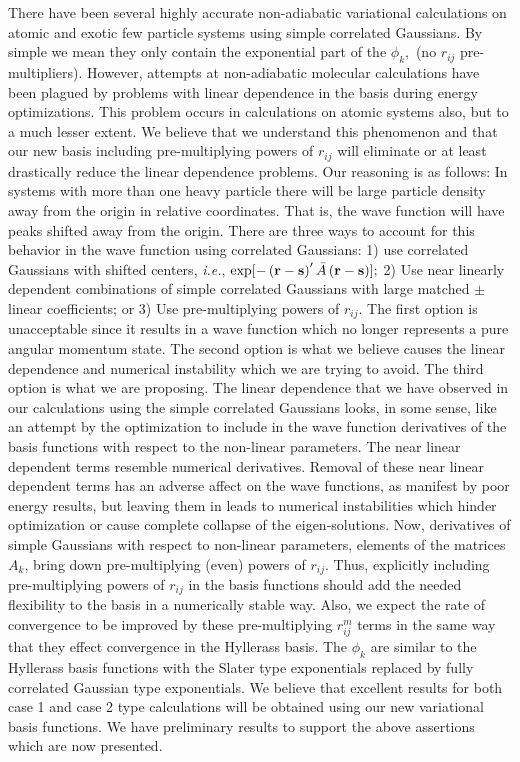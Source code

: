 There have been several highly accurate non-adiabatic variational
calculations on atomic and exotic few particle systems using simple
correlated Gaussians\cite
{Kinghorn93,Kinghorn95b,Kozlowski93b,Kinghorn96a,Varga96}. By simple we mean
they only contain the exponential part of the $\phi _k,$ (no $r_{ij}$
pre-multipliers). However, attempts at non-adiabatic molecular calculations
have been plagued by problems with linear dependence in the basis during
energy optimizations. This problem occurs in calculations on atomic systems
also, but to a much lesser extent. We believe that we understand this
phenomenon and that our new basis including pre-multiplying powers of $%
r_{ij} $ will eliminate or at least drastically reduce the linear dependence
problems. Our reasoning is as follows: In systems with more than one heavy
particle there will be large particle density away from the origin in
relative coordinates. That is, the wave function will have peaks shifted
away from the origin. There are three ways to account for this behavior in
the wave function using correlated Gaussians: 1) use correlated Gaussians
with shifted centers, {\it i.e.}, $\exp [-\left( {\bf r-s}\right) ^{\prime }%
\bar{A}\left( {\bf r-s}\right) ];$ 2) Use near linearly dependent
combinations of simple correlated Gaussians with large matched $\pm $ linear
coefficients; or 3) Use pre-multiplying powers of $r_{ij}$. The first option
is unacceptable since it results in a wave function which no longer
represents a pure angular momentum state. The second option is what we
believe causes the linear dependence and numerical instability which we are
trying to avoid. The third option is what we are proposing. The linear
dependence that we have observed in our calculations using the simple
correlated Gaussians looks, in some sense, like an attempt by the
optimization to include in the wave function derivatives of the basis
functions with respect to the non-linear parameters. The near linear
dependent terms resemble numerical derivatives. Removal of these near linear
dependent terms has an adverse affect on the wave functions, as manifest by
poor energy results, but leaving them in leads to numerical instabilities
which hinder optimization or cause complete collapse of the eigen-solutions.
Now, derivatives of simple Gaussians with respect to non-linear parameters,
elements of the matrices $A_k$, bring down pre-multiplying (even) powers of $%
r_{ij}$. Thus, explicitly including pre-multiplying powers of $r_{ij}$ in
the basis functions should add the needed flexibility to the basis in a
numerically stable way. Also, we expect the rate of convergence to be
improved by these pre-multiplying $r_{ij}^m$ terms in the same way that they
effect convergence in the Hyllerass basis. The $\phi _k$ are similar to the
Hyllerass basis functions with the Slater type exponentials replaced by
fully correlated Gaussian type exponentials. We believe that excellent
results for both case 1 and case 2 type calculations will be obtained using
our new variational basis functions. We have preliminary results to support
the above assertions which are now presented.


